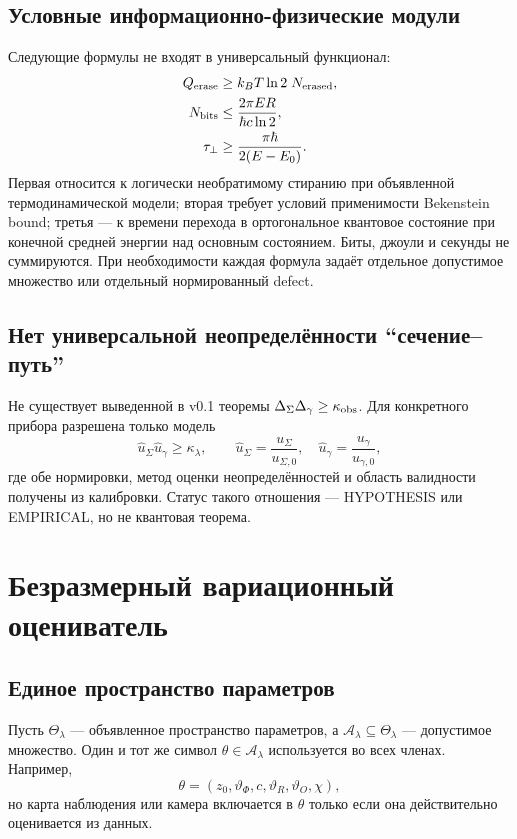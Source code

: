 \documentclass[11pt,a4paper]{article}
\theoremstyle{definition}
\theoremstyle{plain}
\theoremstyle{remark}
\newcommand{\A}{\mathcal{A}}
\newcommand{\status}[1]{\textsf{\footnotesize #1}}
\begin{document}
\subsection{Условные информационно-физические модули}

Следующие формулы не входят в универсальный функционал:
\begin{align*}
Q_{\rm erase}&\ge k_BT\ln2\;N_{\rm erased},\\
N_{\rm bits}&\le
\frac{2\pi ER}{\hbar c\ln2},\\
\tau_\perp&\ge
\frac{\pi\hbar}{2(E-E_0)}.
\end{align*}
Первая относится к логически необратимому стиранию при объявленной
термодинамической модели; вторая требует условий применимости
Bekenstein bound; третья --- к времени перехода в ортогональное
квантовое состояние при конечной средней энергии над основным состоянием.
Биты, джоули и секунды не суммируются. При необходимости каждая формула
задаёт отдельное допустимое множество или отдельный нормированный defect.

\subsection{Нет универсальной неопределённости ``сечение--путь''}

Не существует выведенной в v0.1 теоремы
$\Delta_\Sigma\Delta_\gamma\ge\kappa_{\rm obs}$. Для конкретного прибора
разрешена только модель
\[
\widehat u_\Sigma\widehat u_\gamma\ge\kappa_\lambda,\qquad
\widehat u_\Sigma=\frac{u_\Sigma}{u_{\Sigma,0}},\quad
\widehat u_\gamma=\frac{u_\gamma}{u_{\gamma,0}},
\]
где обе нормировки, метод оценки неопределённостей и область валидности
получены из калибровки. Статус такого отношения --- \status{HYPOTHESIS}
или \status{EMPIRICAL}, но не квантовая теорема.

\section{Безразмерный вариационный оцениватель}

\subsection{Единое пространство параметров}

Пусть $\Theta_\lambda$ --- объявленное пространство параметров, а
$\A_\lambda\subseteq\Theta_\lambda$ --- допустимое множество. Один и тот
же символ $\theta\in\A_\lambda$ используется во всех членах. Например,
\[
\theta=(z_0,\vartheta_\Phi,c,\vartheta_R,\vartheta_O,\chi),
\]
но карта наблюдения или камера включается в $\theta$ только если она
действительно оценивается из данных.
\end{document}
